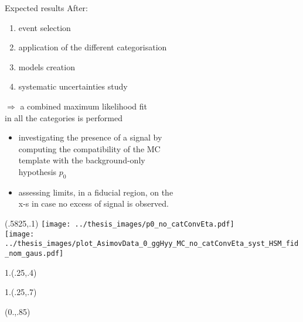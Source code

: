 \documentclass[10pt,UKenglish, leqno, xcolor = dvipsnames]{beamer}
\begin{document}
	\begin{frame}{Expected results}
		\vfill
		After:
		\begin{enumerate}
			\item event selection 
			\item application of the different categorisation
			\item models creation
			\item systematic uncertainties study
		\end{enumerate}
		$\Longrightarrow$ a combined maximum likelihood fit\\ in all the categories is performed
		\begin{itemize}
			\item investigating the presence of a signal by\\ computing the compatibility of the MC\\ template with the background-only\\ hypothesis $p_0$
			\item assessing limits, in a fiducial region, on the\\ x-s in case no excess of signal is observed.
		\end{itemize}
		\vfill		
		\begin{textblock}{1}(.5825,.1)	
			\texttt{[image: ../thesis\_images/p0\_no\_catConvEta.pdf]}\\
			\texttt{[image: ../thesis\_images/plot\_AsimovData\_0\_ggHyy\_MC\_no\_catConvEta\_syst\_HSM\_fid\_nom\_gaus.pdf]}	
		\end{textblock}
		\begin{textblock}{1.}(.25,.4)
		\end{textblock}
		\begin{textblock}{1.}(.25,.7)
		\end{textblock}
		\begin{textblock}{1}(0.,.85)
			\begin{figure}
			\end{figure}
		\end{textblock}
	\end{frame}
\end{document}
